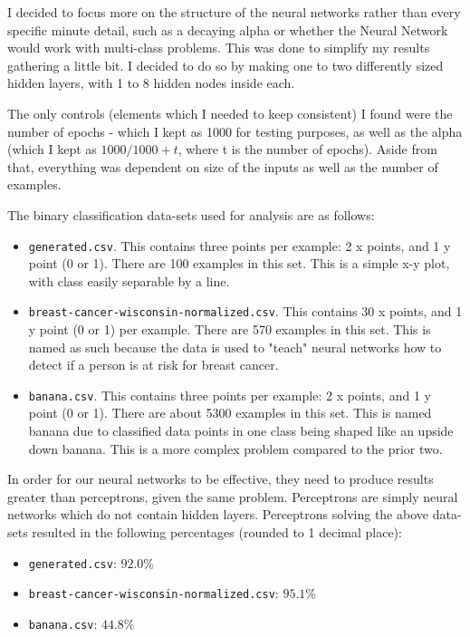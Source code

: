 \documentclass[12pt]{extarticle}
\begin{document}
I decided to focus more on the structure of the neural networks rather than every specific minute detail, such as a decaying alpha or whether the Neural Network would work with multi-class problems. This was done to simplify my results gathering a little bit. I decided to do so by making one to two differently sized hidden layers, with 1 to 8 hidden nodes inside each. 

The only controls (elements which I needed to keep consistent) I found were the number of epochs - which I kept as 1000 for testing purposes, as well as the alpha (which I kept as $1000 / 1000 + t$, where t is the number of epochs). Aside from that, everything was dependent on size of the inputs as well as the number of examples.

The binary classification data-sets used for analysis are as follows:
\begin{itemize}
  \item \verb$generated.csv$. This contains three points per example: 2 x points, and 1 y point (0 or 1). There are 100 examples in this set. This is a simple x-y plot, with class easily separable by a line.
  \item \verb$breast-cancer-wisconsin-normalized.csv$. This contains 30 x points, and 1 y point (0 or 1) per example. There are 570 examples in this set. This is named as such because the data is used to "teach" neural networks how to detect if a person is at risk for breast cancer.
  \item \verb$banana.csv$. This contains three points per example: 2 x points, and 1 y point (0 or 1). There are about 5300 examples in this set. This is named banana due to classified data points in one class being shaped like an upside down banana. This is a more complex problem compared to the prior two.
\end{itemize}

In order for our neural networks to be effective, they need to produce results greater than perceptrons, given the same problem. Perceptrons are simply neural networks which do not contain hidden layers. Perceptrons solving the above data-sets resulted in the following percentages (rounded to 1 decimal place):
\begin{itemize} 
\item \verb$generated.csv$: $92.0\%$
\item \verb$breast-cancer-wisconsin-normalized.csv$: $95.1\%$
\item \verb$banana.csv$: $44.8\%$
\end{itemize}
\end{document}
